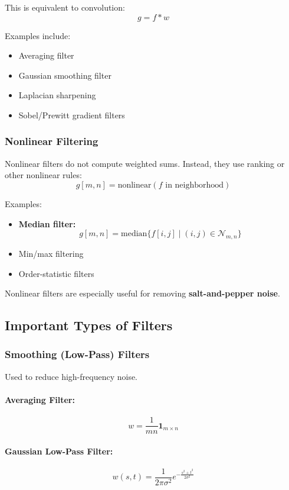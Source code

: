 \documentclass{AnantDocumentation}
\begin{document}
This is equivalent to convolution:
\[
g = f * w
\]

Examples include:
\begin{itemize}
\item Averaging filter
\item Gaussian smoothing filter
\item Laplacian sharpening
\item Sobel/Prewitt gradient filters
\end{itemize}

\subsubsection{Nonlinear Filtering}

Nonlinear filters do not compute weighted sums. Instead, they use ranking or other nonlinear rules:
\[
g[m,n] = \text{nonlinear}(f \text{ in neighborhood})
\]

Examples:
\begin{itemize}
\item \textbf{Median filter:}
\[
g[m,n] = \text{median}\{f[i,j] \mid (i,j)\in \mathcal{N}_{m,n}\}
\]
\item Min/max filtering
\item Order-statistic filters
\end{itemize}

Nonlinear filters are especially useful for removing \textbf{salt-and-pepper noise}.

\subsection{Important Types of Filters}

\subsubsection{Smoothing (Low-Pass) Filters}

Used to reduce high-frequency noise.

\paragraph{Averaging Filter:}
\[
w = \frac{1}{mn} \mathbf{1}_{m \times n}
\]

\paragraph{Gaussian Low-Pass Filter:}
\[
w(s,t) = \frac{1}{2\pi\sigma^2} e^{-\frac{s^2+t^2}{2\sigma^2}}
\]
\end{document}

